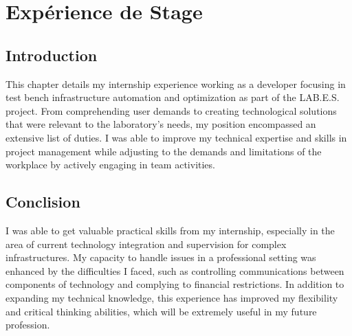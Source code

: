 \chapter{Expérience de Stage}

\section{Introduction}
This chapter details my internship experience working as a developer focusing in test bench infrastructure automation and optimization as part of the LAB.E.S. project. From comprehending user demands to creating technological solutions that were relevant to the laboratory's needs, my position encompassed an extensive list of duties. I was able to improve my technical expertise and skills in project management while adjusting to the demands and limitations of the workplace by actively engaging in team activities.

\clearpage



\section{Conclision}
I was able to get valuable practical skills from my internship, especially in the area of current technology integration and supervision for complex infrastructures. My capacity to handle issues in a professional setting was enhanced by the difficulties I faced, such as controlling communications between components of technology and complying to financial restrictions. In addition to expanding my technical knowledge, this experience has improved my flexibility and critical thinking abilities, which will be extremely useful in my future profession.
